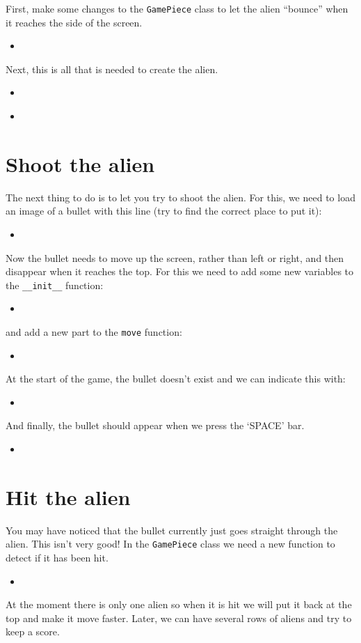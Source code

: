 \documentclass[12pt]{article}
\newcommand{\pythonscript}[2]{
\begin{itemize}
\item[]
\end{itemize}
}
\begin{document}
First, make some changes to the \texttt{GamePiece} class to let the alien
``bounce'' when it reaches the side of the screen.

\pythonscript{bounce}{Changes to the class}

Next, this is all that is needed to create the alien.

\pythonscript{makealien}{Create the alien object}

\pythonscript{usealien}{Use the alien object}

\section{Shoot the alien}

The next thing to do is to let you try to shoot the alien. For this, we need
to load an image of a bullet with this line (try to find the correct place to
put it):

\pythonscript{loadbullet}{Load the bullet image}

Now the bullet needs to move up the screen, rather than left or right, and
then disappear when it reaches the top. For this we need to add some new
variables to the \texttt{\_\_init\_\_} function:

\pythonscript{bulletinit}{New variables}

and add a new part to the \texttt{move} function:

\pythonscript{bulletmove}{New move function}

At the start of the game, the bullet doesn't exist and we can indicate this
with:

\pythonscript{initialisebullet}{Initialise bullet}

And finally, the bullet should appear when we press the `SPACE' bar.

\pythonscript{fire}{Fire!}

\section{Hit the alien}

You may have noticed that the bullet currently just goes straight through the
alien. This isn't very good! In the \texttt{GamePiece} class we need a new
function to detect if it has been hit.

\pythonscript{detecthit}{Detect a hit}

At the moment there is only one alien so when it is hit we will put it back
at the top and make it move faster. Later, we can have several rows of aliens
and try to keep a score.
\end{document}
